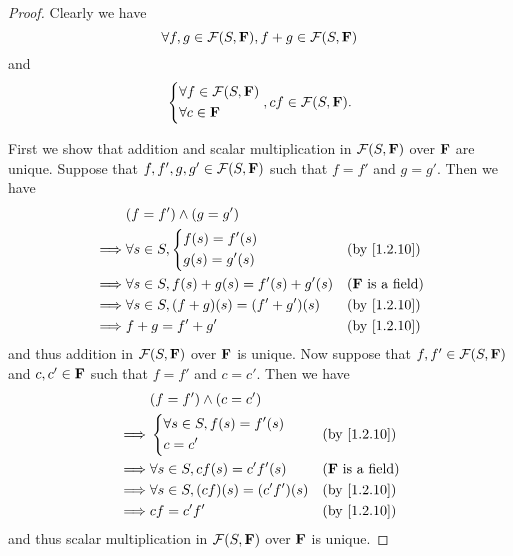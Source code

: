 \begin{proof}
    Clearly we have
    \[
        \forall f, g \in \mathcal{F}\p{S, \F}, f + g \in \mathcal{F}\p{S, \F}
    \]
    and
    \[
        \begin{dcases}
            \forall f \in \mathcal{F}\p{S, \F} \\
            \forall c \in \F
        \end{dcases}, cf \in \mathcal{F}\p{S, \F}.
    \]

    First we show that addition and scalar multiplication in \(\mathcal{F}\p{S, \F}\) over \(\mathbf{F}\) are unique.
    Suppose that \(f, f', g, g' \in \mathcal{F}\p{S, \F}\) such that \(f = f'\) and \(g = g'\).
    Then we have
    \begin{align*}
                 & \p{f = f'} \land \p{g = g'}                                                          \\
        \implies & \forall s \in S, \begin{dcases}
            f\p{s} = f'\p{s} \\
            g\p{s} = g'\p{s}
        \end{dcases}          &  & \text{(by \cref{1.2.10})}  \\
        \implies & \forall s \in S, f\p{s} + g\p{s} = f'\p{s} + g'\p{s} &  & \text{(\(\F\) is a field)} \\
        \implies & \forall s \in S, (f + g)\p{s} = (f' + g')\p{s}       &  & \text{(by \cref{1.2.10})}  \\
        \implies & f + g = f' + g'                                      &  & \text{(by \cref{1.2.10})}
    \end{align*}
    and thus addition in \(\mathcal{F}\p{S, \F}\) over \(\mathbf{F}\) is unique.
    Now suppose that \(f, f' \in \mathcal{F}\p{S, \F}\) and \(c, c' \in \mathbf{F}\) such that \(f = f'\) and \(c = c'\).
    Then we have
    \begin{align*}
                 & \p{f = f'} \land \p{c = c'}                                                   \\
        \implies & \begin{dcases}
            \forall s \in S, f\p{s} = f'\p{s} \\
            c = c'
        \end{dcases}                    &  & \text{(by \cref{1.2.10})}  \\
        \implies & \forall s \in S, c f\p{s} = c' f'\p{s}        &  & \text{(\(\F\) is a field)} \\
        \implies & \forall s \in S, \p{cf}\p{s} = \p{c' f'}\p{s} &  & \text{(by \cref{1.2.10})}  \\
        \implies & cf = c' f'                                    &  & \text{(by \cref{1.2.10})}
    \end{align*}
    and thus scalar multiplication in \(\mathcal{F}\p{S, \F}\) over \(\mathbf{F}\) is unique.


\end{proof}
